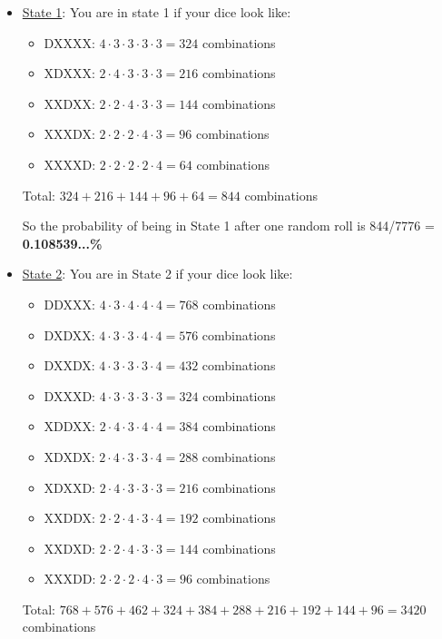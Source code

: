 \documentclass[12pt,a4paper]{article}
\begin{document}
\begin{itemize}
\begin{itemize}
    \item \underline{State 1}: You are in state 1 if your dice look like:
    \begin{itemize}
        \item DXXXX: $4 \cdot 3 \cdot 3 \cdot 3 \cdot 3 = 324$ combinations
        \item XDXXX: $2 \cdot 4 \cdot 3 \cdot 3 \cdot 3 = 216$ combinations
        \item XXDXX: $2 \cdot 2 \cdot 4 \cdot 3 \cdot 3 = 144$ combinations
        \item XXXDX: $2 \cdot 2 \cdot 2 \cdot 4 \cdot 3 = 96$ combinations
        \item XXXXD: $2 \cdot 2 \cdot 2 \cdot 2 \cdot 4 = 64$ combinations
    \end{itemize}
    Total: $324 +216 + 144 + 96 + 64 = 844$ combinations

    So the probability of being in State 1 after one random roll is 844/7776 = \textbf{0.108539...\%}
    \item \underline{State 2}: You are in State 2 if your dice look like:
    \begin{itemize}
        \item DDXXX: $4 \cdot 3 \cdot 4 \cdot 4 \cdot 4 = 768$ combinations
        \item DXDXX: $4 \cdot 3 \cdot 3 \cdot 4 \cdot 4 = 576$ combinations
        \item DXXDX: $4 \cdot 3 \cdot 3 \cdot 3 \cdot 4 = 432$ combinations
        \item DXXXD: $4 \cdot 3 \cdot 3 \cdot 3 \cdot 3 = 324$ combinations
        \item XDDXX: $2 \cdot 4 \cdot 3 \cdot 4 \cdot 4 = 384$ combinations
        \item XDXDX: $2 \cdot 4 \cdot 3 \cdot 3 \cdot 4 = 288$ combinations
        \item XDXXD: $2 \cdot 4 \cdot 3 \cdot 3 \cdot 3 = 216$ combinations
        \item XXDDX: $2 \cdot 2 \cdot 4 \cdot 3 \cdot 4 = 192$ combinations
        \item XXDXD: $2 \cdot 2 \cdot 4 \cdot 3 \cdot 3 = 144$ combinations
        \item XXXDD: $2 \cdot 2 \cdot 2 \cdot 4 \cdot 3 = 96$ combinations
    \end{itemize}
    Total: $768 + 576 + 462 + 324 + 384 + 288 + 216 + 192 + 144 + 96 = 3420$ combinations


\end{itemize}
\end{itemize}
\end{document}
